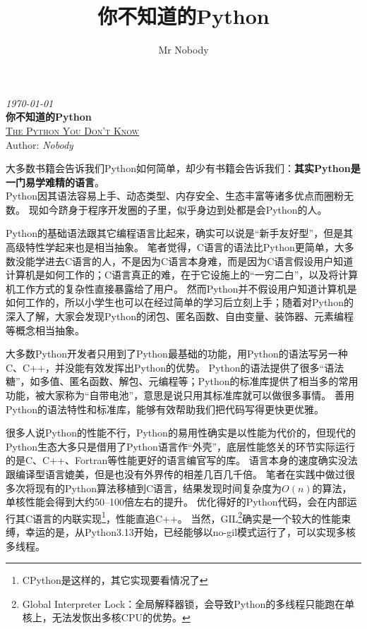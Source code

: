 \documentclass{ctexbook}
\title{你不知道的Python}
\author{Mr Nobody}
\begin{document}
\begin{titlepage}
\raggedleft
{\scriptsize\itshape \today}\\[3in]
{\Huge\bfseries 你不知道的Python}\\[2mm]
{\large\scshape\underline{The Python You Don't  Know}}\\[5mm]
{\normalsize Author: \itshape Nobody}
\end{titlepage}

\frontmatter

大多数书籍会告诉我们Python如何简单，却少有书籍会告诉我们：\linebreak\textbf{其实Python是一门易学难精的语言}。\\[0.1in]

Python因其语法容易上手、动态类型、内存安全、生态丰富等诸多优点而圈粉无数。
现如今跻身于程序开发圈的子里，似乎身边到处都是会Python的人。

Python的基础语法跟其它编程语言比起来，确实可以说是``新手友好型''，但是其高级特性学起来也是相当抽象。
笔者觉得，C语言的语法比Python更简单，大多数没能学进去C语言的人，不是因为C语言本身难，而是因为C语言假设用户知道计算机是如何工作的；C语言真正的难，在于它设施上的``一穷二白''，以及将计算机工作方式的复杂性直接暴露给了用户。
然而Python并不假设用户知道计算机是如何工作的，所以小学生也可以在经过简单的学习后立刻上手；随着对Python的深入了解，大家会发现Python的闭包、匿名函数、自由变量、装饰器、元素编程等概念相当抽象。

大多数Python开发者只用到了Python最基础的功能，用Python的语法写另一种C、C++，并没能有效发挥出Python的优势。
Python的语法提供了很多``语法糖''，如多值、匿名函数、解包、元编程等；Python的标准库提供了相当多的常用功能，被大家称为``自带电池''，意思是说只用其标准库就可以做很多事情。
善用Python的语法特性和标准库，能够有效帮助我们把代码写得更快更优雅。

很多人说Python的性能不行，Python的易用性确实是以性能为代价的，但现代的Python生态大多只是借用了Python语言作``外壳''，底层性能悠关的环节实际运行的是C、C++、Fortran等性能更好的语言编官写的库。
语言本身的速度确实没法跟编译型语言媲美，但是也没有外界传的相差几百几千倍。
笔者在实践中做过很多次将现有的Python算法移植到C语言，结果发现时间复杂度为$O(n)$的算法，单核性能会得到大约50--100倍左右的提升。
优化得好的Python代码，会在内部运行其C语言的内联实现\footnote{CPython是这样的，其它实现要看情况了}，性能直追C++。
当然，GIL\footnote{Global Interpreter Lock：全局解释器锁，会导致Python的多线程只能跑在单核上，无法发恢出多核CPU的优势。}确实是一个较大的性能束缚，幸运的是，从Python3.13开始，已经能够以no-gil模式运行了，可以实现多核多线程。
\end{document}
